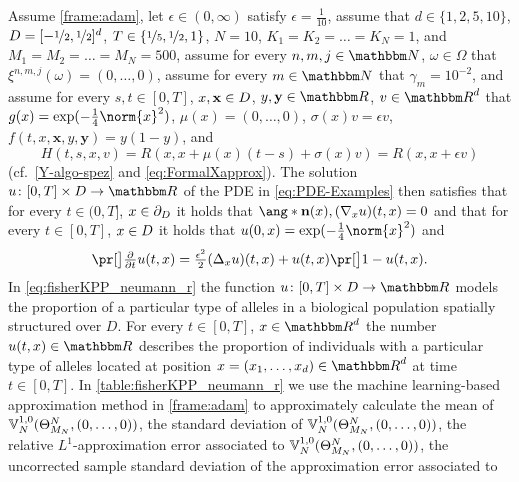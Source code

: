 Assume 
	\cref{frame:adam},
let
	$\epsilon\in(0,\infty)$
satisfy
	$\epsilon = \tfrac{1}{10}$,
assume that
	$d\in\{1,2,5,10\}$,
	$D = [-\nicefrac{1}{2},\nicefrac{1}{2}]^d$,
	$T\in\{\nicefrac{1}{5},\nicefrac{1}{2},1\}$,
	$N=10$,
	$K_1 = K_2 = \ldots = K_N= 1$, and
	$M_1 = M_2 = \ldots = M_N = 500$,
assume 
	for every 
		$n,m,j\in \N$, $\omega \in \Omega$ 
	that 
		$\xi^{n,m,j}(\omega)=(0,\dots,0)$,
assume 
	for every 
		$m \in \N$
	that
		$\gamma_m = 10^{-2}$,
and assume 
	for every 
		$s,t \in [0,T]$,
		$x,\mathbf{x} \in D$,
		$y,\mathbf{y} \in \R$,
		$v
		\in \R^d$ 
	that
		$g(x)=  \exp (-\tfrac{1}{4}\norm{x}^2)$,
		$\mu(x)=(0,\dots,0)$,
		$\sigma(x) v =\epsilon v$, 
		$f(t,x,\mathbf{x},y,\mathbf{y}
		)= y(1-y)$, and
		\begin{equation}
			\label{eq:Hfkpp}
			H(t,s,x,v) 
			= 
			R(x,x+\mu(x)(t-s)+\sigma(x)v)
			=
			R(x,x+\epsilon v)
		\end{equation} 
		(cf.\ \eqref{Y-algo-spez} and \eqref{eq:FormalXapprox}).
The solution 
	$u\colon[0,T]\times \D \to \R$ 
	of the PDE in \eqref{eq:PDE-Examples} then satisfies that 
		for every
			$t\in (0,T]$, 
			$x\in\partial_D$
		it holds that
			$\ang*{\mathbf{n}(x) ,(\nabla_x u)(t,x)} = 0$
	and that 
		for every
			$t\in [0,T]$, $x\in D$
		it holds that
			$u(0,x) =  \exp (-\tfrac{1}{4}\norm{x}^2)$ and
		\begin{equation}
			\label{eq:fisherKPP_neumann_r}
    		\bpr{\tfrac{\partial }{\partial t}u} (t,x) 
			=
			\tfrac{\epsilon^2}{2}(\Delta_x u) (t,x) + u(t,x)\bpr{1 - u(t,x) }
			.
		\end{equation}
% 
%
In \eqref{eq:fisherKPP_neumann_r} the function $u\colon [0,T]\times D\to\R$ models the proportion of a particular type of alleles in a biological population spatially structured over $D$.
For every $t\in[0,T]$, $x\in\R^d$ the number $u(t,x) \in \R$ describes the proportion of individuals with a particular type of alleles located at position $x = (x_1, \dots, x_d) \in \R^d$ at time $t \in [0,T]$.
In \cref{table:fisherKPP_neumann_r} 
we use the machine learning-based approximation method
in \cref{frame:adam}
to approximately calculate
the mean of %
$
{\mathbb{V}}^{1,0}_N(\Theta^N_{M_N},\allowbreak (0,\ldots,0))
$,
the standard deviation of %
$
{\mathbb{V}}^{1,0}_N(\Theta^N_{M_N},\allowbreak (0,\ldots,0))
$,
the relative $ L^1 $-ap\-prox\-i\-ma\-tion error associated to %
$
{\mathbb{V}}^{1,0}_N(\Theta^N_{M_N},\allowbreak (0,\ldots,0))
$,
the uncorrected sample standard deviation of the approximation error associated to %
